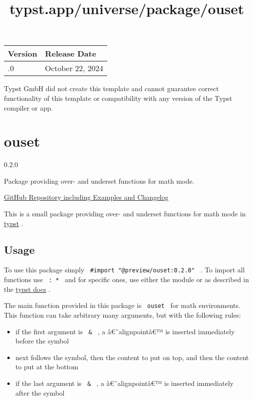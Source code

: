 \begin{longtable}[]{@{}ll@{}}
\toprule\noalign{}
Version & Release Date \\
\midrule\noalign{}
\endhead
\bottomrule\noalign{}
\endlastfoot
0.1.0 & October 22, 2024 \\
\end{longtable}

Typst GmbH did not create this template and cannot guarantee correct
functionality of this template or compatibility with any version of the
Typst compiler or app.


\title{typst.app/universe/package/ouset}

\label{banner}
\section{ouset}\label{ouset}

{ 0.2.0 }

Package providing over- and underset functions for math mode.

\label{readme}
\href{https://github.com/ludwig-austermann/typst-ouset}{GitHub
Repository including Examples and Changelog}

This is a small package providing over- and underset functions for math
mode in \href{https://typst.app/}{typst} .

\subsection{Usage}\label{usage}

To use this package simply \texttt{\ \#import\ "@preview/ouset:0.2.0"\ }
. To import all functions use \texttt{\ :\ *\ } and for specific ones,
use either the module or as described in the
\href{https://typst.app/docs/reference/scripting\#modules}{typst docs} .

The main function provided in this package is \texttt{\ ouset\ } for
math environments. This function can take arbitrary many arguments, but
with the following rules:

\begin{itemize}
\tightlist
\item
  if the first argument is \texttt{\ \&\ } , a â€˜alignpointâ€™ is
  inserted immediately before the symbol
\item
  next follows the symbol, then the content to put on top, and then the
  content to put at the bottom
\item
  if the last argument is \texttt{\ \&\ } , a â€˜alignpointâ€™ is
  inserted immediately after the symbol
\end{itemize}


